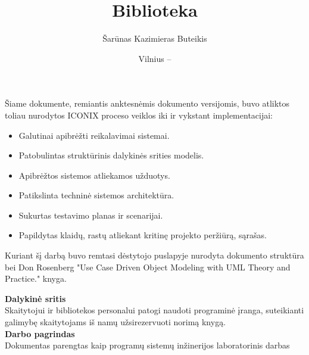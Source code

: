 \documentclass{VUMIFPSkursinis}
\title{Biblioteka}
\author{Šarūnas Kazimieras Buteikis}
\date{Vilnius – \the\year}
\begin{document}
	
\maketitle
\cleardoublepage{}
\setcounter{page}{2}
Šiame dokumente, remiantis anktesnėmis dokumento versijomis, buvo atliktos toliau nurodytos ICONIX proceso veiklos iki ir vykstant implementacijai:\\
	\begin{itemize}
    	\item Galutinai apibrėžti reikalavimai sistemai.
    	\item Patobulintas struktūrinis dalykinės srities modelis.
    	\item Apibrėžtos sistemos atliekamos užduotys.
    	\item Patikslinta techninė sistemos architektūra.
        \item Sukurtas testavimo planas ir scenarijai.
        \item Papildytas klaidų, rastų atliekant kritinę projekto peržiūrą, sąrašas. 
	\end{itemize}
\tableofcontents{}


Kuriant šį darbą buvo remtasi dėstytojo puslapyje nurodyta dokumento struktūra \cite{1} bei Don Rosenberg "Use Case Driven Object Modeling with UML Theory and Practice."\cite{2}  knyga.

\noindent
\textbf{Dalykinė sritis}\\ 
Skaitytojui ir bibliotekos personalui patogi naudoti programinė įranga, suteikianti galimybę skaitytojams iš namų užsirezervuoti norimą knygą.\\ 
\textbf{Darbo pagrindas}\\
Dokumentas parengtas kaip programų sistemų inžinerijos laboratorinis darbas\\
\pagebreak
\end{document}
